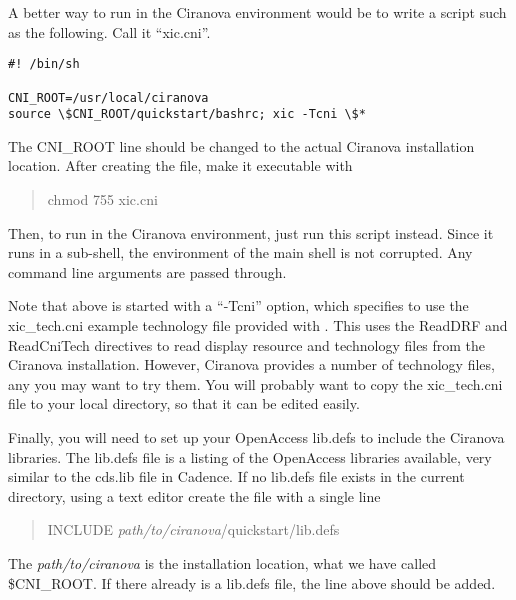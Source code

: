 A better way to run {\Xic} in the Ciranova environment would be to
write a script such as the following.  Call it ``{\vt xic.cni}''.

\begin{verbatim}
#! /bin/sh

CNI_ROOT=/usr/local/ciranova
source \$CNI_ROOT/quickstart/bashrc; xic -Tcni \$*
\end{verbatim}

The {\vt CNI\_ROOT} line should be changed to the actual Ciranova
installation location.  After creating the file, make it executable
with
\begin{quote}
\vt chmod 755 xic.cni
\end{quote}

Then, to run {\Xic} in the Ciranova environment, just run this script
instead.  Since it runs in a sub-shell, the environment of the main
shell is not corrupted.  Any command line arguments are passed
through.

Note that above {\Xic} is started with a ``{\vt -Tcni}'' option, which
specifies to use the {\vt xic\_tech.cni} example technology file
provided with {\Xic}.  This uses the {\vt ReadDRF} and {\vt
ReadCniTech} directives to read display resource and technology files
from the Ciranova installation.  However, Ciranova provides a number
of technology files, any you may want to try them.  You will probably
want to copy the {\vt xic\_tech.cni} file to your local directory, so
that it can be edited easily.

Finally, you will need to set up your OpenAccess {\vt lib.defs} to
include the Ciranova libraries.  The {\vt lib.defs} file is a listing
of the OpenAccess libraries available, very similar to the {\vt
cds.lib} file in Cadence.  If no {\vt lib.defs} file exists in the
current directory, using a text editor create the file with a single
line
\begin{quote}
{\vt INCLUDE} {\it path/to/ciranova\/}{\vt /quickstart/lib.defs}
\end{quote}
The {\it path/to/ciranova} is the installation location, what we have
called {\vt \$CNI\_ROOT}.  If there already is a {\vt lib.defs} file,
the line above should be added.

